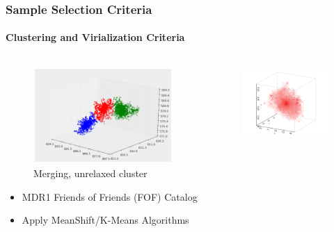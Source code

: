 \documentclass[hyperref={pdfpagelabels=false}]{beamer}
\begin{document}
\begin{frame}
\frametitle{Sample Selection Criteria}
\framesubtitle{Clustering and Virialization Criteria}
  \begin{columns}
    \centering
    \begin{column}{0.5\textwidth}
      \begin{figure}
        \includegraphics[width=\textwidth]{clustering_example.png}
        \caption{Merging, unrelaxed cluster}
      \end{figure}
      \begin{itemize}
      \item MDR1 Friends of Friends (FOF) Catalog
      \item Apply MeanShift/K-Means Algorithms
      \end{itemize}
    \end{column}
   \begin{column}{0.5\textwidth}
      \begin{figure}
        \includegraphics[width=\textwidth]{mdr1haloexample.png}

\end{figure}
\end{column}
\end{columns}
\end{frame}
\end{document}
